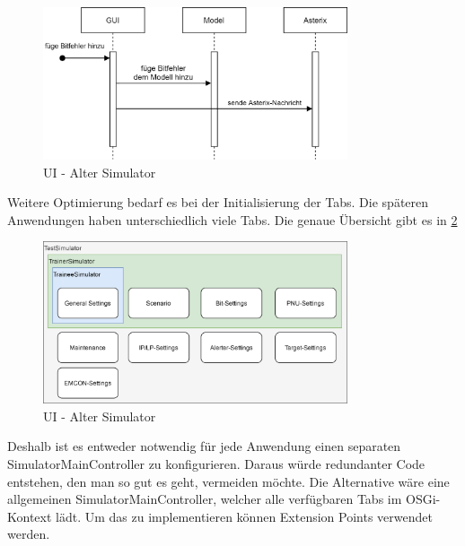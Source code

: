 \begin{figure}[h]
    \centering
    \includegraphics[width=0.8\textwidth]{content/assets/Kapitel3/AlterSimulator.png}
    \caption{UI - Alter Simulator}
    \label{img:AlterSimulator}
\end{figure}

Weitere Optimierung bedarf es bei der Initialisierung der Tabs. Die späteren Anwendungen haben unterschiedlich viele Tabs. Die genaue Übersicht gibt es 
in \ref{fig:TabsPerApp}

\begin{figure}[ht]
    \centering
    \includegraphics[width=0.8\textwidth]{content/assets/Kapitel3/TabsPerApp.png}
    \caption{UI - Alter Simulator}
    \label{fig:TabsPerApp}
\end{figure}

Deshalb ist es entweder notwendig für jede Anwendung einen separaten SimulatorMainController zu konfigurieren. Daraus würde redundanter Code entstehen, 
den man so gut es geht, vermeiden möchte. Die Alternative wäre eine allgemeinen SimulatorMainController, welcher alle verfügbaren Tabs im OSGi-Kontext 
lädt. Um das zu implementieren können Extension Points verwendet werden.
